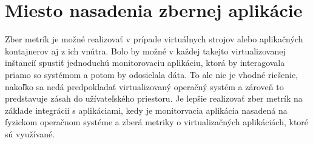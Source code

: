 \documentclass[11pt,final,oneside]{fithesis}
\begin{document}
\section{Miesto nasadenia zbernej aplikácie}
Zber metrík je možné realizovať v prípade virtuálnych strojov alebo aplikačných kontajnerov aj z ich vnútra. Bolo by možné v každej
takejto virtualizovanej inštancií spustiť jednoduchú monitorovaciu aplikáciu, ktorá by interagovala priamo so systémom a potom by odosielala dáta.
To ale nie je vhodné riešenie, nakoľko sa nedá predpokladať virtualizovaný operačný systém a zároveň to predstavuje zásah do užívateľského
priestoru. Je lepšie realizovať zber metrík na základe integrácií s aplikáciami, kedy je monitorvacia aplikácia nasadená na fyzickom
operačnom systéme a zberá metriky o virtualizačných aplikáciách, ktoré sú využívané.
\end{document}
